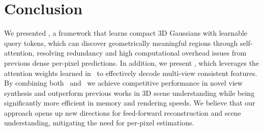 \section{Conclusion}
\label{sec:conclusion}
We presented \ours, a framework that learns compact 3D Gaussians with learnable query tokens, which can discover geometrically meaningful regions through self-attention, resolving redundancy and high computational overhead issues from previous dense per-pixel predictions. In addition, we present \oursF, which leverages the attention weights learned in \ours\ to effectively decode multi-view consistent features. By combining both \ours\ and \oursF\, we achieve competitive performance in novel view synthesis and outperform previous works in 3D scene understanding while being significantly more efficient in memory and rendering speeds. We believe that our approach opens up new directions for feed-forward reconstruction and scene understanding, mitigating the need for per-pixel estimations.